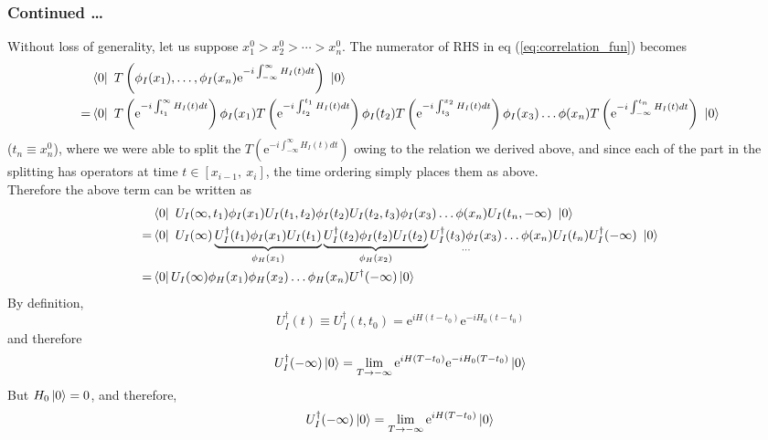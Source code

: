 \documentclass[11pt, notitlepage]{report}
\newcommand{\e}{\mathrm{e}}
\numberwithin{equation}{section}
\begin{document}
\subsubsection{Continued \ldots}

Without loss of generality, let us suppose \(x_1^0 > x_2^0 > \cdots > x_n^0\). The numerator of RHS in eq (\ref{eq:correlation_fun}) becomes 
\begin{align*}
    &\bra{0} ~T\left( \phi_I(x_1),\ldots,\phi_I(x_n)  \e^{-i\int_{-\infty}^{\infty}H_I(t)dt}\right)~ \ket{0} \\
    =&\bra{0} ~T\left( \e^{-i\int_{t_1}^{\infty}H_I(t)dt}\right) \phi_I(x_1)T\left( \e^{-i\int_{t_2}^{t_1}H_I(t)dt}\right)\phi_I(t_2)T\left( \e^{-i\int_{t_3}^{x_2}H_I(t)dt}\right)\phi_I(x_3) \ldots \phi(x_n)T\left( \e^{-i\int_{-\infty}^{t_n}H_I(t)dt}\right)~ \ket{0} 
\end{align*}
(\(t_n \equiv x_n^0\)), where we were able to split the \(T\left( \e^{-i\int_{-\infty}^{\infty}H_I(t)dt}\right)\) owing to the relation we derived above, and since each of the part in the splitting has operators at time \(t\in [x_{i-1},~x_i]\), the time ordering simply places them as above.\\
Therefore the above term can be written as 
\begin{align*}
    & \bra{0} ~U_I(\infty, t_1) \phi_I(x_1)U_I(t_1, t_2)\phi_I(t_2)U_I(t_2, t_3)\phi_I(x_3) \ldots \phi(x_n) U_I(t_n, -\infty)~ \ket{0} \\
    =&\bra{0} ~U_I(\infty)\underbrace{U_I^\dagger(t_1) \phi_I(x_1)U_I(t_1)}_{\phi_H(x_1)}\underbrace{U_I^\dagger(t_2)\phi_I(t_2)U_I(t_2)}_{\phi_H(x_2)} \underset{\ldots}{U_I^\dagger(t_3)\phi_I(x_3)} \ldots \phi(x_n) U_I(t_n)U_I^\dagger(-\infty)~ \ket{0}\\
    = & \bra{0} U_I(\infty) \phi_H(x_1) \phi_H(x_2) \ldots \phi_H(x_n) U^\dagger(-\infty)\ket{0}
\end{align*}
By definition, 
\begin{equation*}
    U_I^\dagger(t) \equiv U_I^\dagger(t, t_0) = \e^{iH(t - t_0)}\e^{-iH_0(t-t_0)} 
\end{equation*}
and therefore 
\begin{equation*}
    U_I^\dagger (-\infty)\ket{0} = \lim_{T\to -\infty} \e^{iH(T-t_0)}\e^{-iH_0(T-t_0)}\ket{0}
\end{equation*}
But \(H_0\ket{0} = 0\), and therefore, 
\begin{equation*}
    U_I^\dagger (-\infty)\ket{0} = \lim_{T\to -\infty} \e^{iH(T-t_0)}\ket{0}
\end{equation*}
\end{document}
